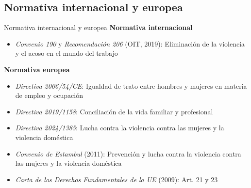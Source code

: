 \documentclass{beamer}
\begin{document}
    \subsection{Normativa internacional y europea}
    \begin{frame}{Normativa internacional y europea}
        \textbf{Normativa internacional}
        \begin{itemize}
            \item \textit{Convenio 190} y \textit{Recomendación 206} (OIT, 2019): Eliminación de la violencia y el acoso en el mundo del trabajo
        \end{itemize}
        \textbf{Normativa europea}
        \begin{itemize}
            \item \textit{Directiva 2006/54/CE}: Igualdad de trato entre hombres y mujeres en materia de empleo y ocupación
            \item \textit{Directiva 2019/1158}: Conciliación de la vida familiar y profesional
            \item \textit{Directiva 2024/1385}: Lucha contra la violencia contra las mujeres y la violencia doméstica
            \item \textit{Convenio de Estambul} (2011): Prevención y lucha contra la violencia contra las mujeres y la violencia doméstica
            \item \textit{Carta de los Derechos Fundamentales de la UE} (2009): Art. 21 y 23
        \end{itemize}
    \end{frame}
\end{document}
